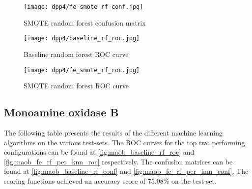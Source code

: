 \begin{figure}[H]
    \begin{center}
        \caption[]{SMOTE random forest confusion matrix}
        \label{fig:dpp4_smote_rf_conf}
        \texttt{[image: dpp4/fe\_smote\_rf\_conf.jpg]}
    \end{center}

\end{figure}

\begin{figure}[H]
    \begin{center}
        \caption[]{Baseline random forest ROC curve}
        \label{fig:dpp4_baseline_rf_roc}
        \texttt{[image: dpp4/baseline\_rf\_roc.jpg]}
    \end{center}

\end{figure}

\begin{figure}[H]
    \begin{center}
        \caption[]{SMOTE random forest ROC curve}
        \label{fig:dpp4_smote_rf_roc}
        \texttt{[image: dpp4/fe\_smote\_rf\_roc.jpg]}
    \end{center}
\end{figure}
\subsection{Monoamine oxidase B}
The following table presents the results of the different machine learning algorithms on the various
test-sets. The ROC curves for the top two performing configurations can be found at \ref{fig:maob_baseline_rf_roc} and \ref{fig:maob_fe_rf_per_knn_roc}
respectively. The confusion matrices can be found at \ref{fig:maob_baseline_rf_conf} and \ref{fig:maob_fe_rf_per_knn_conf}.
The scoring functions achieved an accuracy score of 75.98\% on the test-set.

